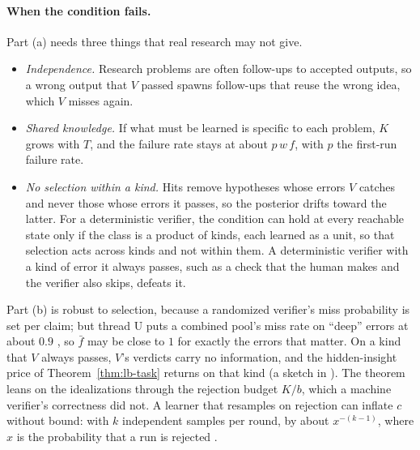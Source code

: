 \documentclass[11pt]{article}
\theoremstyle{definition}
\theoremstyle{remark}
\newcommand{\K}{K}
\begin{document}
\paragraph{When the condition fails.} Part (a) needs three things that real research may not give.
\begin{itemize}[nosep]
\item \emph{Independence.} Research problems are often follow-ups to accepted outputs, so a wrong output that $V$ passed spawns follow-ups that reuse the wrong idea, which $V$ misses again.
\item \emph{Shared knowledge.} If what must be learned is specific to each problem, $\K$ grows with $T$, and the failure rate stays at about $p\,w\,f$, with $p$ the first-run failure rate.
\item \emph{No selection within a kind.} Hits remove hypotheses whose errors $V$ catches and never those whose errors it passes, so the posterior drifts toward the latter. For a deterministic verifier, the condition can hold at every reachable state only if the class is a product of kinds, each learned as a unit, so that selection acts across kinds and not within them. A deterministic verifier with a kind of error it always passes, such as a check that the human makes and the verifier also skips, defeats it.
\end{itemize}
Part (b) is robust to selection, because a randomized verifier's miss probability is set per claim; but thread U puts a combined pool's miss rate on ``deep'' errors at about $0.9$ \cite{threadU}, so $\bar f$ may be close to $1$ for exactly the errors that matter. On a kind that $V$ always passes, $V$'s verdicts carry no information, and the hidden-insight price of Theorem~\ref{thm:lb-task} returns on that kind (a sketch in \cite{threadQ2}). The theorem leans on the idealizations through the rejection budget $\K/b$, which a machine verifier's correctness did not. A learner that resamples on rejection can inflate $c$ without bound: with $k$ independent samples per round, by about $x^{-(k-1)}$, where $x$ is the probability that a run is rejected \cite{referee9}.
\end{document}
